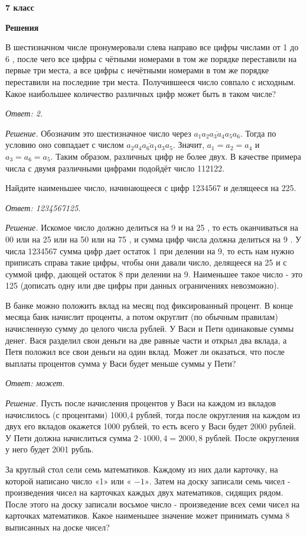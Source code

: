 \centerline{\bf \huge 7 класс}
\centerline{\bf \huge Решения}

В шестизначном числе пронумеровали слева направо все цифры числами от 1 до 6 , после чего все цифры с чётными номерами в том же порядке переставили на первые три места, а все цифры с нечётными номерами в том же порядке переставили на последние три места. Получившееся число совпало с исходным. Какое наибольшее количество различных цифр может быть в таком числе?

\textit{Ответ: 2.}

\textit{Решение.}
Обозначим это шестизначное число через $\overline{a_1 a_2 a_3 a_4 a_5 a_6}$. Тогда по условию оно совпадает с числом $\overline{a_2 a_4 a_6 a_1 a_3 a_5}$. Значит, $a_1=a_2=a_4$ и $a_3=a_6=a_5$. Таким образом, различных цифр не более двух. В качестве примера числа с двумя различными цифрами подойдёт число 112122.

Найдите наименьшее число, начинающееся с цифр 1234567 и делящееся на 225.

\textit{Ответ: 1234567125.}

\textit{Решение.}
Искомое число должно делиться на 9 и на 25 , то есть оканчиваться на 00 или на 25 или на 50 или на 75 , и сумма цифр числа должна делиться на 9 . У числа 1234567 сумма цифр дает остаток 1 при делении на 9, то есть нам нужно приписать справа такие цифры, чтобы они давали число, делящееся на 25 и с суммой цифр, дающей остаток 8 при делении на 9. Наименьшее такое число - это 125 (дописать одну или две цифры при данных ограничениях невозможно).

В банке можно положить вклад на месяц под фиксированный процент. В конце месяца банк начислит проценты, а потом округлит (по обычным правилам) начисленную сумму до целого числа рублей. У Васи и Пети одинаковые суммы денег. Вася разделил свои деньги на две равные части и открыл два вклада, а Петя положил все свои деньги на один вклад. Может ли оказаться, что после выплаты процентов сумма у Васи будет меньше суммы у Пети?

\textit{Ответ: может.}

\textit{Решение.} 
Пусть после начисления процентов у Васи на каждом из вкладов начислилось (с процентами) 1000,4 рублей, тогда после округления на каждом из двух его вкладов окажется 1000 рублей, то есть всего у Васи будет 2000 рублей. У Пети должна начислиться сумма $2 \cdot 1000,4=2000,8$ рублей. После округления у него будет 2001 рубль.

За круглый стол сели семь математиков. Каждому из них дали карточку, на которой написано число «1» или « $-1 »$. Затем на доску записали семь чисел - произведения чисел на карточках каждых двух математиков, сидящих рядом. После этого на доску записали восьмое число - произведение всех семи чисел на карточках математиков. Какое наименьшее значение может принимать сумма 8 выписанных на доске чисел?

